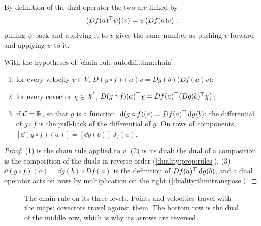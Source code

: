 \begin{notechapter}
By definition of the dual operator the two are linked by
\begin{equation}\label{chain-rule-autodiff:eq:pairing}
  \bigl(Df(a)^{\top}\psi\bigr)(v) = \psi\bigl(Df(a)v\bigr) :
\end{equation}
pulling $\psi$ back and applying it to $v$ gives the same number as
pushing $v$ forward and applying $\psi$ to it.

\begin{proposition}
\label{chain-rule-autodiff:prop:two-readings}
With the hypotheses of \cref{chain-rule-autodiff:thm:chain}:
\begin{enumerate}[nosep]
  \item for every velocity $v\in V$,
        $D(g\circ f)(a)v = Dg(b)\bigl(Df(a)v\bigr)$;
  \item for every covector $\chi\in X^*$,
        $D(g\circ f)(a)^{\top}\chi
        = Df(a)^{\top}\bigl(Dg(b)^{\top}\chi\bigr)$;
  \item if $\mathcal C = \mathbb{R}$, so that $g$ is a function,
        $\mathrm{d}(g\circ f)(a) = Df(a)^{\top}\,\mathrm{d} g(b)$: the differential of
        $g\circ f$ is the pull-back of the differential of $g$. On rows of
        components, $[\dd(g\circ f)(a)] = [\dd g(b)]\,J_f(a)$.
\end{enumerate}
\end{proposition}

\begin{proof}
(1) is the chain rule applied to $v$. (2) is its dual: the dual of a
composition is the composition of the duals in reverse order
(\cref{duality:prop:rules}). (3)
$\dd(g\circ f)(a) = \dd g(b)\circ Df(a)$ is the definition of
$Df(a)^{\top}\,\mathrm{d} g(b)$, and a dual operator acts on rows by
multiplication on the right (\cref{duality:thm:transpose}).
\end{proof}

\begin{figure}[ht]
\centering
{}
\caption{The chain rule on its three levels. Points and velocities travel
with the maps; covectors travel against them. The bottom row is the dual
of the middle row, which is why its arrows are reversed.}
\label{chain-rule-autodiff:fig:three-rows}
\end{figure}


\end{notechapter}
